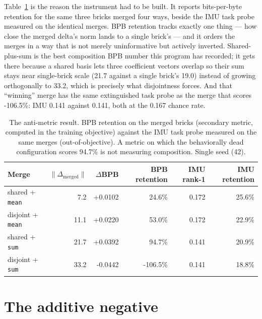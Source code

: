 \documentclass[11pt]{article}
\begin{document}
Table~\ref{tab:bpb} is the reason the instrument had to be built. It reports bits-per-byte retention for the same three bricks merged four ways, beside the IMU task probe measured on the identical merges. BPB retention tracks exactly one thing --- how close the merged delta's norm lands to a single brick's --- and it orders the merges in a way that is not merely uninformative but actively inverted. Shared-plus-sum is the best composition BPB number this program has recorded; it gets there because a shared basis lets three coefficient vectors overlap so their sum stays near single-brick scale (21.7 against a single brick's 19.0) instead of growing orthogonally to 33.2, which is precisely what disjointness forces. And that ``winning'' merge has the same extinguished task probe as the merge that scores -106.5\%: IMU 0.141 against 0.141, both at the 0.167 chance rate.

\begin{table}[t]
\centering
\caption{The anti-metric result. BPB retention on the merged bricks (secondary metric, computed in the training objective) against the IMU task probe measured on the same merges (out-of-objective). A metric on which the behaviorally dead configuration scores 94.7\% is not measuring composition. Single seed (42).}
\label{tab:bpb}
\small
\begin{tabular}{lrrrrr}
\toprule
Merge & $\|\Delta_{\mathrm{merged}}\|$ & $\Delta$BPB & BPB retention & IMU rank-1 & IMU retention \\
\midrule
shared + \texttt{mean} & 7.2 & +0.0102 & 24.6\% & 0.172 & 25.6\% \\
disjoint + \texttt{mean} & 11.1 & +0.0220 & 53.0\% & 0.172 & 22.9\% \\
shared + \texttt{sum} & 21.7 & +0.0392 & 94.7\% & 0.141 & 20.9\% \\
disjoint + \texttt{sum} & 33.2 & -0.0442 & -106.5\% & 0.141 & 18.8\% \\
\bottomrule
\end{tabular}
\end{table}

\section{The additive negative}
\label{sec:negative}
\end{document}
